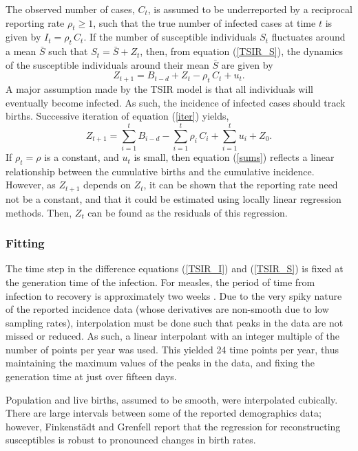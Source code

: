 \documentclass[10pt]{article}
\begin{document}
The observed number of cases, $C_t$, is assumed to be underreported by a reciprocal reporting rate $\rho_t \ge 1$, such that the true number of infected cases at time $t$ is given by $I_t = \rho_t \,C_t$. If the number of susceptible individuals $S_t$ fluctuates around a mean $\bar{S}$ such that $S_t = \bar{S} + Z_t$, then, from equation (\ref{TSIR_S}), the dynamics of the susceptible individuals around their mean $\bar{S}$ are given by
\begin{equation}
Z_{t+1} = B_{t-d} + Z_{t} - \rho_t\,C_t + u_t.
\label{iter}
\end{equation}
A major assumption made by the TSIR model is that all individuals will eventually become infected. As such, the incidence of infected cases should track births. Successive iteration of equation (\ref{iter}) yields,
\begin{equation}
Z_{t+1} = \sum_{i=1}^t B_{i-d} - \sum_{i=1}^t \rho_i \, C_i + \sum_{i=1}^t u_i + Z_0.
\label{sums}
\end{equation}
If $\rho_t = \rho$ is a constant, and $u_t$ is small, then equation (\ref{sums}) reflects a linear relationship between the cumulative births and the cumulative incidence. However, as $Z_{t+1}$ depends on $Z_t$, it can be shown that the reporting rate need not be a constant, and that it could be estimated using locally linear regression methods. Then, $Z_t$ can be found as the residuals of this regression. 






\subsubsection*{Fitting}

The time step in the difference equations (\ref{TSIR_I}) and (\ref{TSIR_S}) is fixed at the generation time of the infection. For measles, the period of time from infection to recovery is approximately two weeks \cite{Anderson1991}. Due to the very spiky nature of the reported incidence data (whose derivatives are non-smooth due to low sampling rates), interpolation must be done such that peaks in the data are not missed or reduced. As such, a linear interpolant with an integer multiple of the number of points per year was used. This yielded 24 time points per year, thus maintaining the maximum values of the peaks in the data, and fixing the generation time at just over fifteen days.

Population and live births, assumed to be smooth, were interpolated cubically. There are large intervals between some of the reported demographics data; however, Finkenst\"{a}dt and Grenfell \cite{Finkenstadt2000} report that the regression for reconstructing susceptibles is robust to pronounced changes in birth rates.
\end{document}

